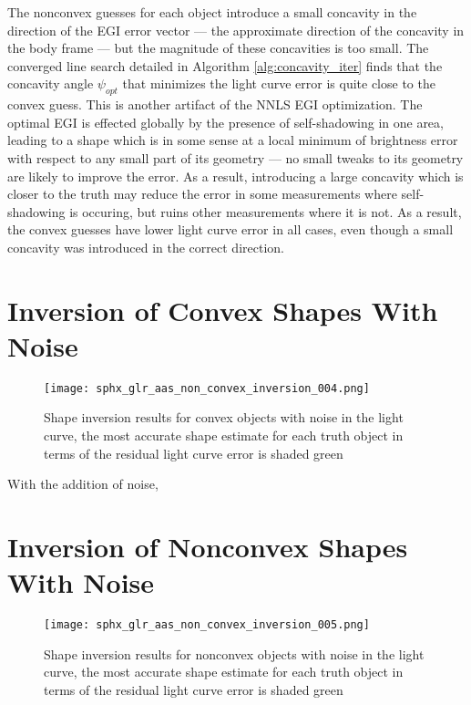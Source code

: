 The nonconvex guesses for each object introduce a small concavity in the direction of the EGI error vector --- the approximate direction of the concavity in the body frame --- but the magnitude of these concavities is too small. The converged line search detailed in Algorithm \ref{alg:concavity_iter} finds that the concavity angle $\psi_{opt}$ that minimizes the light curve error is quite close to the convex guess. This is another artifact of the NNLS EGI optimization. The optimal EGI is effected globally by the presence of self-shadowing in one area, leading to a shape which is in some sense at a local minimum of brightness error with respect to any small part of its geometry --- no small tweaks to its geometry are likely to improve the error. As a result, introducing a large concavity which is closer to the truth may reduce the error in some measurements where self-shadowing is occuring, but ruins other measurements where it is not. As a result, the convex guesses have lower light curve error in all cases, even though a small concavity was introduced in the correct direction.

\clearpage
\section{Inversion of Convex Shapes With Noise}

\begin{figure}[!htb]
  \centering
  \texttt{[image: sphx\_glr\_aas\_non\_convex\_inversion\_004.png]}
  \caption{Shape inversion results for convex objects with noise in the light curve, the most accurate shape estimate for each truth object in terms of the residual light curve error is shaded green}
  \label{fig:res_convex_with_noise}
\end{figure}

With the addition of noise, 

\clearpage
\section{Inversion of Nonconvex Shapes With Noise}

\begin{figure}[!htb]
  \centering
  \texttt{[image: sphx\_glr\_aas\_non\_convex\_inversion\_005.png]}
  \caption{Shape inversion results for nonconvex objects with noise in the light curve, the most accurate shape estimate for each truth object in terms of the residual light curve error is shaded green}
  \label{fig:res_nonconvex_with_noise}
\end{figure}

